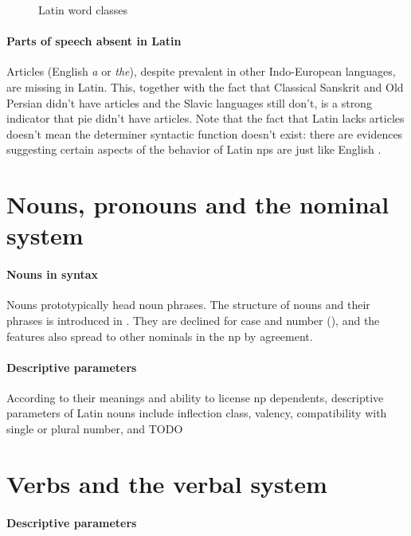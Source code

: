 \documentclass[a4paper, oneside, 12pt]{report}
\newcommand{\form}[1]{\emph{#1}}
\begin{document}
\begin{sidewaysfigure}
    \centering
    \small
    
    \caption{Latin word classes}
    \label{fig:latin-word-class}
\end{sidewaysfigure}

\paragraph*{Parts of speech absent in Latin} 
Articles (English \form{a} or \form{the}), 
despite prevalent in other Indo-European languages,
are missing in Latin.
This, together with the fact that Classical Sanskrit and Old Persian didn't have articles 
and the Slavic languages still don't,
is a strong indicator that \ac{pie} didn't have articles. 
Note that the fact that Latin lacks articles 
doesn't mean the determiner syntactic function doesn't exist:
there are evidences suggesting certain aspects of the behavior of Latin \acs{np}s 
are just like English \citep{giusti2014split}.

\section{Nouns, pronouns and the nominal system}

\paragraph*{Nouns in syntax}
Nouns prototypically head noun phrases.
The structure of nouns and their phrases is introduced in .
They are declined for case and number (),
and the features also spread to other nominals in the \acs{np} by agreement.

\paragraph*{Descriptive parameters} 
According to their meanings and ability to license \acs{np} dependents, 
descriptive parameters of Latin nouns include 
inflection class, valency, compatibility with single or plural number, and TODO

\section{Verbs and the verbal system}

\paragraph*{Descriptive parameters}
\end{document}
